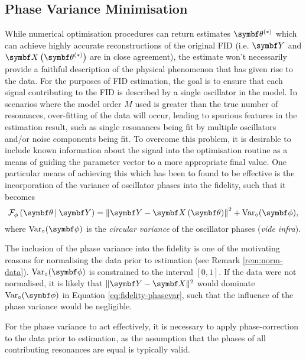 \subsection{Phase Variance Minimisation}
\label{subsec:phase-variance}
While numerical optimisation procedures can return estimates $\bthstar$ which
can achieve highly accurate reconstructions of the original \acs{FID} (i.e.
$\bY$ and  $\bXthstar$ are in close agreement), the estimate won't
necessarily provide a faithful description of the physical phenomenon that has
given rise to the data. For the purposes of \ac{FID} estimation, the goal is to
ensure that each signal contributing to the \ac{FID} is described by a
single oscillator in the model. In scenarios where the model order $M$ used is
greater than the true number of resonances, over-fitting of the data will
occur, leading to spurious features in the estimation result, such as single
resonances being fit by multiple oscillators and/or noise components being fit.
To overcome this problem, it is desirable to include known information about
the signal into the optimisation routine as a means of guiding the parameter
vector to a more appropriate final value. One particular means of achieving
this which has been to found to be effective is the incorporation of the
variance of oscillator phases into the fidelity, such that it becomes
\begin{equation}
    \FphithY = \left \lVert \bY - \bXth \right \rVert^2 + \circvar,
    \label{eq:fidelity-phasevar}
\end{equation}
where $\circvar$ is the \emph{circular variance} of the oscillator phases
(\textit{vide infra}).
\begin{remark}
    The inclusion of the phase variance into the fidelity is one of the
    motivating reasons for normalising the data prior to estimation (see Remark
    \ref{rem:norm-data}). $\circvar$ is constrained to the interval $[0, 1]$.
    If the data were not normalised, it is likely that $\lVert \bY - \bX
    \rVert^2$ would dominate $\circvar$ in Equation \ref{eq:fidelity-phasevar},
    such that the influence of the phase variance would be negligible.
\end{remark}
For the phase variance to act effectively, it is necessary to apply
phase-correction to the data prior to estimation, as the assumption that the
phases of all contributing resonances are equal is typically
valid.

